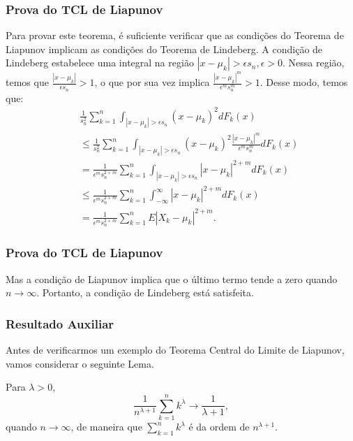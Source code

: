 \begin{frame}
\frametitle{\textbf{Prova do TCL de Liapunov}}
\baselineskip=13pt
\begin{block}{}

Para provar este teorema, é suficiente verificar que as
condições do Teorema de Liapunov implicam as condições do Teorema de
Lindeberg. A condição de Lindeberg estabelece uma integral na região
$|x-\mu_k|>\epsilon s_n,\epsilon>0$. Nessa região, temos que
$\frac{|x-\mu_k|}{\epsilon s_n}>1$, o que por sua vez implica
$\frac{|x-\mu_k|^m}{\epsilon^m s_n^m}>1$. Desse modo, temos que:
\begin{eqnarray}
& & \frac{1}{s_n^2}\sum_{k=1}^{n}\int_{|x-\mu_k|>\epsilon
s_n}(x-\mu_k)^2dF_k(x) \nonumber\\
& & \leq
\frac{1}{s_n^2}\sum_{k=1}^{n}\int_{|x-\mu_k|>\epsilon
s_n}(x-\mu_k)^2\frac{|x-\mu_k|^m}{\epsilon^m s_n^m}dF_k(x)
\nonumber\\
& & =\frac{1}{\epsilon^m
s_n^{2+m}}\sum_{k=1}^{n}\int_{|x-\mu_k|>\epsilon
s_n}|x-\mu_k|^{2+m}dF_k(x) \nonumber\\
& & \leq \frac{1}{\epsilon^m
s_n^{2+m}}\sum_{k=1}^{n}\int_{-\infty}^{\infty}|x-\mu_k|^{2+m}dF_k(x)
\nonumber \\
& & = \frac{1}{\epsilon^m
s_n^{2+m}}\sum_{k=1}^{n}E|X_k-\mu_k|^{2+m}. \nonumber
\end{eqnarray}

\end{block}
\end{frame}

\begin{frame}
\frametitle{\textbf{Prova do TCL de Liapunov}}
\baselineskip=13pt
\begin{block}{}


Mas a condição de Liapunov implica que o último termo tende a zero
quando $n\rightarrow\infty$. Portanto, a condição de Lindeberg está
satisfeita.

\end{block}
\end{frame}

\begin{frame}
\frametitle{\textbf{Resultado Auxiliar}}


Antes de verificarmos um exemplo do Teorema Central do Limite de Liapunov, vamos considerar o seguinte Lema.

\begin{lema}
Para $\lambda>0$,
$$\frac{1}{n^{\lambda+1}}\sum_{k=1}^{n}k^{\lambda}\rightarrow \frac{1}{\lambda+1},$$
quando $n\rightarrow\infty$, de maneira que $\sum_{k=1}^{n}k^{\lambda}$ é da ordem de $n^{\lambda+1}$.
\end{lema}

\end{frame}

